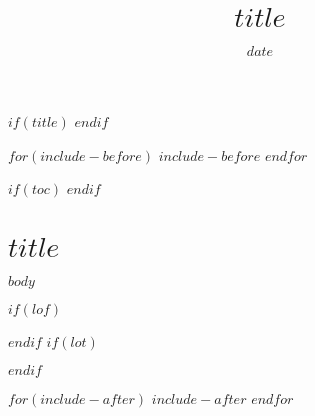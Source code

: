 \documentclass[$if(lang)$$lang$,$endif$$if(citecolor)$$citecolor$,$endif$$if(urlcolor)$$urlcolor$,$endif$$if(linkcolor)$$linkcolor$,$endif$$for(classoption)$$classoption$$sep$,$endfor$]{drreport}
\title{$title$}
\date{$date$}
\begin{document}
$if(title)$
\maketitlepage
\clearpage
$endif$

$for(include-before)$
$include-before$
$endfor$

$if(toc)$
\setcounter{tocdepth}{$toc-depth$}
\begingroup
\renewcommand\contentsname{}
\let\cleardoublepage\clearpage
\tableofcontents
\endgroup
$endif$
\chapter*{$title$}
$body$

\begin{fullwidth}
\begin{multicols}{2}

\backmatter
$if(lof)$
\listoffigures
$endif$
$if(lot)$
\listoftables
$endif$

\printindex

\end{multicols}
\end{fullwidth}

$for(include-after)$
$include-after$
$endfor$
\end{document}
